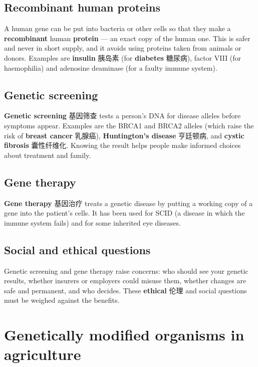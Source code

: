 \documentclass[11pt]{article}
\begin{document}
\subsection*{Recombinant human proteins}

A human gene can be put into bacteria or other cells so that they make a \textbf{recombinant} human \textbf{protein} — an exact copy of the human one. This is safer and never in short supply, and it avoids using proteins taken from animals or donors. Examples are \textbf{insulin} 胰岛素 (for \textbf{diabetes} 糖尿病), factor VIII (for haemophilia) and adenosine deaminase (for a faulty immune system).

\subsection*{Genetic screening}

\textbf{Genetic screening} 基因筛查 tests a person's DNA for disease alleles before symptoms appear. Examples are the BRCA1 and BRCA2 alleles (which raise the risk of \textbf{breast cancer} 乳腺癌), \textbf{Huntington's disease} 亨廷顿病, and \textbf{cystic fibrosis} 囊性纤维化. Knowing the result helps people make informed choices about treatment and family.

\subsection*{Gene therapy}

\textbf{Gene therapy} 基因治疗 treats a genetic disease by putting a working copy of a gene into the patient's cells. It has been used for SCID (a disease in which the immune system fails) and for some inherited eye diseases.

\subsection*{Social and ethical questions}

Genetic screening and gene therapy raise concerns: who should see your genetic results, whether insurers or employers could misuse them, whether changes are safe and permanent, and who decides. These \textbf{ethical} 伦理 and social questions must be weighed against the benefits.

\section*{Genetically modified organisms in agriculture}
\end{document}
